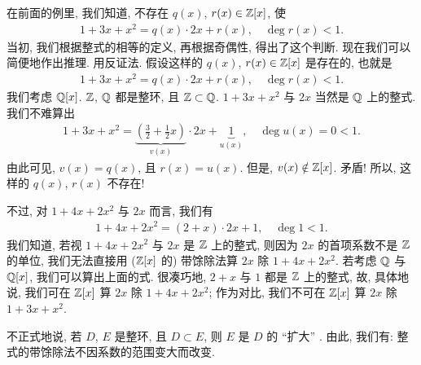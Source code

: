 在前面的例里, 我们知道, 不存在 $q(x)$, $r(x) \in \mathbb{Z}[x]$, 使
\begin{align*}
    1 + 3x + x^2 = q(x) \cdot 2x + r(x), \quad \deg r(x) < 1.
\end{align*}
当初, 我们根据整式的相等的定义, 再根据奇偶性, 得出了这个判断. 现在我们可以简便地作出推理. 用反证法. 假设这样的 $q(x)$, $r(x) \in \mathbb{Z}[x]$ 是存在的, 也就是
\begin{align*}
    1 + 3x + x^2 = q(x) \cdot 2x + r(x), \quad \deg r(x) < 1.
\end{align*}
我们考虑 $\mathbb{Q}[x]$. $\mathbb{Z}$, $\mathbb{Q}$ 都是整环, 且 $\mathbb{Z} \subset \mathbb{Q}$. $1+3x+x^2$ 与 $2x$ 当然是 $\mathbb{Q}$ 上的整式. 我们不难算出
\begin{align*}
    1 + 3x + x^2 = {\underbrace{\left( \frac{3}{2} + \frac{1}{2}x \right)}_{v(x)}} \cdot 2x + \underbrace{1}_{u(x)}, \quad \deg u(x) = 0 < 1.
\end{align*}
由此可见, $v(x) = q(x)$, 且 $r(x) = u(x)$. 但是, $v(x) \notin \mathbb{Z}[x]$. 矛盾! 所以, 这样的 $q(x)$, $r(x)$ 不存在!

不过, 对 $1 + 4x + 2x^2$ 与 $2x$ 而言, 我们有
\begin{align*}
    1 + 4x + 2x^2 = (2 + x) \cdot 2x + 1, \quad \deg 1 < 1.
\end{align*}
我们知道, 若视 $1 + 4x + 2x^2$ 与 $2x$ 是 $\mathbb{Z}$ 上的整式, 则因为 $2x$ 的首项系数不是 $\mathbb{Z}$ 的单位, 我们无法直接用 ($\mathbb{Z}[x]$ 的) 带馀除法算 $2x$ 除 $1 + 4x + 2x^2$. 若考虑 $\mathbb{Q}$ 与 $\mathbb{Q}[x]$, 我们可以算出上面的式. 很凑巧地, $2 + x$ 与 $1$ 都是 $\mathbb{Z}$ 上的整式, 故, 具体地说, 我们可在 $\mathbb{Z}[x]$ 算 $2x$ 除 $1 + 4x + 2x^2$; 作为对比, 我们不可在 $\mathbb{Z}[x]$ 算 $2x$ 除 $1 + 3x + x^2$.

不正式地说, 若 $D$, $E$ 是整环, 且 $D \subset E$, 则 $E$ 是 $D$ 的 ``扩大'' . 由此, 我们有: 整式的带馀除法不因系数的范围变大而改变.
